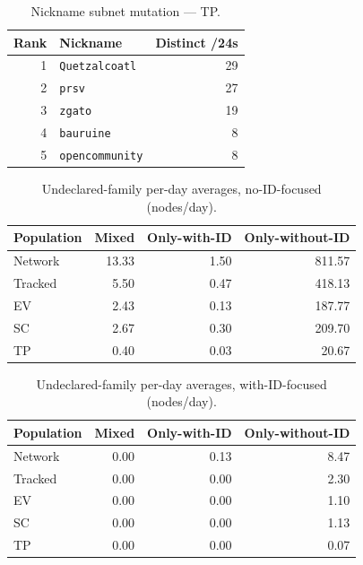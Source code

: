 \documentclass[conference]{IEEEtran}
\begin{document}
\begin{table}[H]
\caption{Nickname subnet mutation --- TP.}
\begin{center}\small
\begin{tabular}{|r|l|r|}
\hline
\textbf{Rank} & \textbf{Nickname} & \textbf{Distinct /24s} \\ \hline
1 & \texttt{Quetzalcoatl} & 29 \\ \hline
2 & \texttt{prsv} & 27 \\ \hline
3 & \texttt{zgato} & 19 \\ \hline
4 & \texttt{bauruine} & 8 \\ \hline
5 & \texttt{opencommunity} & 8 \\ \hline
\end{tabular}
\label{tab:subnetchg_third_party_probe}
\end{center}\end{table}
 
\begin{table}[H]
\caption{Undeclared-family per-day averages, no-ID-focused (nodes/day).}
\begin{center}\small
\begin{tabular}{|l|r|r|r|}
\hline
\textbf{Population} & \textbf{Mixed} & \textbf{Only-with-ID} & \textbf{Only-without-ID} \\ \hline
Network & 13.33 & 1.50 & 811.57 \\ \hline
Tracked & 5.50 & 0.47 & 418.13 \\ \hline
EV & 2.43 & 0.13 & 187.77 \\ \hline
SC & 2.67 & 0.30 & 209.70 \\ \hline
TP & 0.40 & 0.03 & 20.67 \\ \hline
\end{tabular}
\label{tab:undeclared_perday_noid}
\end{center}\end{table}
 
\begin{table}[H]
\caption{Undeclared-family per-day averages, with-ID-focused (nodes/day).}
\begin{center}\small
\begin{tabular}{|l|r|r|r|}
\hline
\textbf{Population} & \textbf{Mixed} & \textbf{Only-with-ID} & \textbf{Only-without-ID} \\ \hline
Network & 0.00 & 0.13 & 8.47 \\ \hline
Tracked & 0.00 & 0.00 & 2.30 \\ \hline
EV & 0.00 & 0.00 & 1.10 \\ \hline
SC & 0.00 & 0.00 & 1.13 \\ \hline
TP & 0.00 & 0.00 & 0.07 \\ \hline
\end{tabular}
\label{tab:undeclared_perday_wid}
\end{center}\end{table}
 
\end{document}
